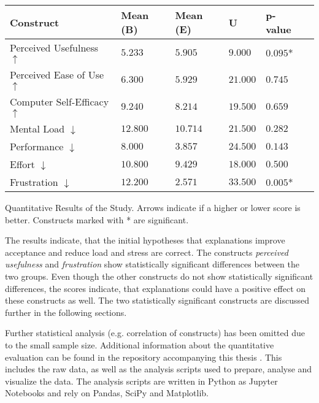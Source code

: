 \begin{ctable}
    \begin{tabularx}{\textwidth}{l|X|X|X|X|X}
        \textbf{Construct} & \textbf{Mean (B)} & \textbf{Mean (E)} & \textbf{U} & \textbf{p-value} \\
        \hline
        Perceived Usefulness $\uparrow$ & $5.233$ &  $5.905$ &  $9.000$ &  $0.095$* \\
        Perceived Ease of Use $\uparrow$ & $6.300$ &  $5.929$ &  $21.000$ &  $0.745$ \\
        Computer Self-Efficacy $\uparrow$ & $9.240$ &  $8.214$ &  $19.500$ &  $0.659$ \\
        Mental Load $\downarrow$ & $12.800$ &  $10.714$ &  $21.500$ &  $0.282$ \\
        Performance $\downarrow$ & $8.000$ &  $3.857$ &  $24.500$ &  $0.143$ \\
        Effort $\downarrow$ & $10.800$ &  $9.429$ &  $18.000$ &  $0.500$ \\
        Frustration $\downarrow$ & $12.200$ &  $2.571$ &  $33.500$ &  $0.005$* \\
    \end{tabularx}
    \caption[Quantitative Results of the Study]{Quantitative Results of the Study. Arrows indicate if a higher or lower score is better. Constructs marked with * are significant.}
    \label{tab:quant_results}
\end{ctable}

The results indicate, that the initial hypotheses that explanations improve acceptance and reduce load and stress are correct. The constructs \textit{perceived usefulness} and \textit{frustration} show statistically significant differences between the two groups. Even though the other constructs do not show statistically significant differences, the scores indicate, that explanations could have a positive effect on these constructs as well. The two statistically significant constructs are discussed further in the following sections.

Further statistical analysis (e.g. correlation of constructs) has been omitted due to the small sample size. Additional information about the quantitative evaluation can be found in the repository accompanying this thesis \parencite{Goepfert2025}. This includes the raw data, as well as the analysis scripts used to prepare, analyse and visualize the data. The analysis scripts are written in Python as Jupyter Notebooks and rely on Pandas, SciPy and Matplotlib.

